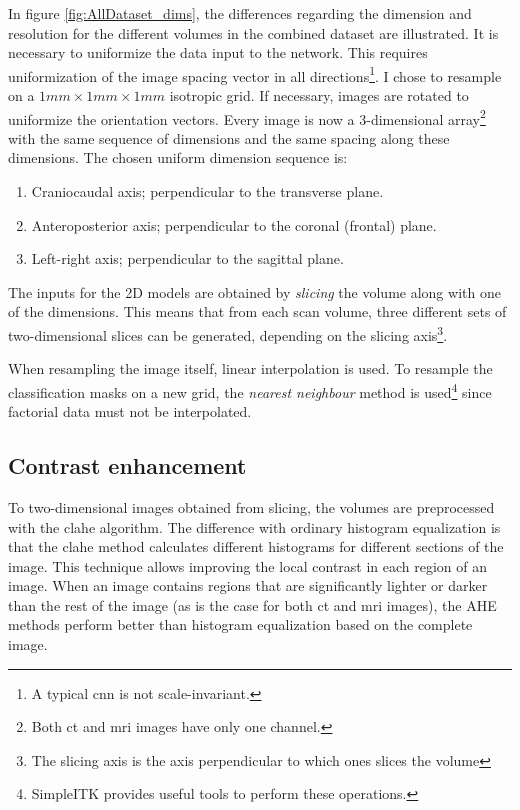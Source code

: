 In figure \ref{fig:AllDataset_dims}, the differences regarding the dimension and resolution for the different volumes in the combined dataset are illustrated. 
It is necessary to uniformize the data input to the network. 
This requires uniformization of the image spacing vector in all directions\footnote{A typical \acrshort{cnn} is not scale-invariant.}. 
I chose to resample on a $1mm\times 1mm \times 1mm$ isotropic grid. 
If necessary, images are rotated to uniformize the orientation vectors. 
Every image is now a 3-dimensional array\footnote{Both \acrshort{ct} and \acrshort{mri} images have only one channel.} with the same sequence of dimensions and the same spacing along these dimensions.
The chosen uniform dimension sequence is:
\begin{enumerate} 
    \item Craniocaudal axis; perpendicular to the transverse plane.
    \item Anteroposterior axis; perpendicular to the coronal (frontal) plane.
    \item Left-right axis; perpendicular to the sagittal plane.
\end{enumerate}
The inputs for the 2D models are obtained by \textit{slicing} the volume along with one of the dimensions.
This means that from each scan volume, three different sets of two-dimensional slices can be generated, depending on the slicing axis\footnote{The slicing axis is the axis perpendicular to which ones slices the volume}.

When resampling the image itself, linear interpolation is used. 
To resample the classification masks on a new grid, the \textit{nearest neighbour} method is used\footnote{
    SimpleITK \cite{sitk} provides useful tools to perform these operations.
    } 
since factorial data must not be interpolated. 

\subsection{Contrast enhancement}
To two-dimensional images obtained from slicing, the volumes are preprocessed with the \acrfull{clahe} algorithm. 
The difference with ordinary histogram equalization is that the \acrshort{clahe} method calculates different histograms for different sections of the image.
This technique allows improving the local contrast in each region of an image.
When an image contains regions that are significantly lighter or darker than the rest of the image (as is the case for both \acrshort{ct} and \acrshort{mri} images), the AHE methods perform better than histogram equalization based on the complete image.

